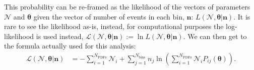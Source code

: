 This probability can be re-framed as the likelihood of the vectors of parameters $\bm{\mathcal{N}}$ and $\bm{\theta}$ given the vector of number of events in each bin, $\bm{n}$: $L\left(\bm{\mathcal{N}}, \bm{\theta} | \bm{n}\right)$. It is rare to see the likelihood as-is, instead, for computational purposes the log-likelihood is used instead, $\mathcal{L}\left(\bm{\mathcal{N}}, \bm{\theta} | \bm{n}\right) := \ln{L}\left(\bm{\mathcal{N}}, \bm{\theta} | \bm{n}\right)$. We can then get to the formula actually used for this analysis:
\begin{align}
    \mathcal{L}\left(\bm{\mathcal{N}}, \bm{\theta} | \bm{n}\right) &=
    -\sum_{i=1}^{N_{\mathrm{PDFs}}}\mathcal{N}_{i} 
    + \sum_{j=1}^{N_{\mathrm{bins}}}n_{j}\ln{\left(\sum_{i=1}^{N_{\textrm{PDFs}}} \mathcal{N}_{i}P_{ij}\left(\bm{\theta}\right)\right)}.%
\end{align}


